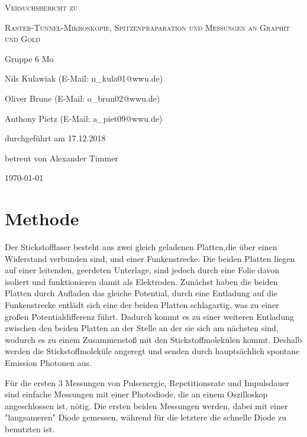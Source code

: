 \documentclass[
	a4paper,
	12pt,
	pagesize,
	ngerman
]{scrartcl}
\begin{document}
\begin{titlepage}
	\centering
	{\scshape\LARGE Versuchsbericht zu \par}
	\vspace{1cm}
	{\scshape\huge Raster-Tunnel-Mikroskopie, Spitzenpräparation und Messungen an Graphit und Gold     \par}
	\vspace{2.5cm}
	{\LARGE Gruppe 6 Mo\par}
	\vspace{0.5cm}
	{\large Nils Kulawiak (E-Mail: n\_kula01@wwu.de) \par}
	{\large Oliver Brune (E-Mail: o\_brun02@wwu.de) \par}
	{\large Anthony Pietz (E-Mail: a\_piet09@wwu.de) \par}
	\vfill
	durchgeführt am 17.12.2018\par
	
	\vfill
	betreut von Alexander Timmer\par
	
	\vfill
	{\large \today\par}
\end{titlepage}

\tableofcontents
\newpage

\section{Methode}
Der Stickstofflaser besteht aus zwei gleich geladenen Platten,die über einen Widerstand verbunden sind, und einer Funkenstrecke. Die beiden Platten liegen auf einer leitenden, geerdeten Unterlage, sind jedoch durch eine Folie davon isoliert und funktionieren damit als Elektroden. Zunächst haben die beiden Platten durch Aufladen das gleiche Potential, durch eine Entladung auf die Funkenstrecke entlädt sich eine der beiden Platten schlagartig, was zu einer großen Potentialdifferenz führt. Dadurch kommt es zu einer weiteren Entladung zwischen den beiden Platten an der Stelle an der sie sich am nächsten sind, wodurch es zu einem Zusammenstoß mit den Stickstoffmolekülen kommt. Deshalb werden die Stickstoffmoleküle angeregt und senden durch hauptsächlich spontane Emission Photonen aus. %

Für die ersten 3 Messungen von Pulsenergie, Repetitionsrate und Impulsdauer sind einfache Messungen mit einer Photodiode, die an einem Oszilloskop angeschlossen ist, nötig. Die ersten beiden Messungen werden, dabei mit einer "langsameren" Diode gemessen, während für die letztere die schnelle Diode zu benutzten ist.
\end{document}
